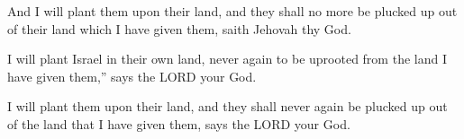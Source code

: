 			\begin{versebox}
					\item[BHS] 
					\item[LXX] 
					\item[ASV] And I will plant them upon their land, and they shall no more be plucked up out of their land which I have given them, saith Jehovah thy God.
					\item[NIV] I will plant Israel in their own land, never again to be uprooted from the land I have given them,” says the LORD your God.
					\item[NRSV] I will plant them upon their land, and they shall never again be plucked up out of the land that I have given them, says the LORD your God.
			\end{versebox}
